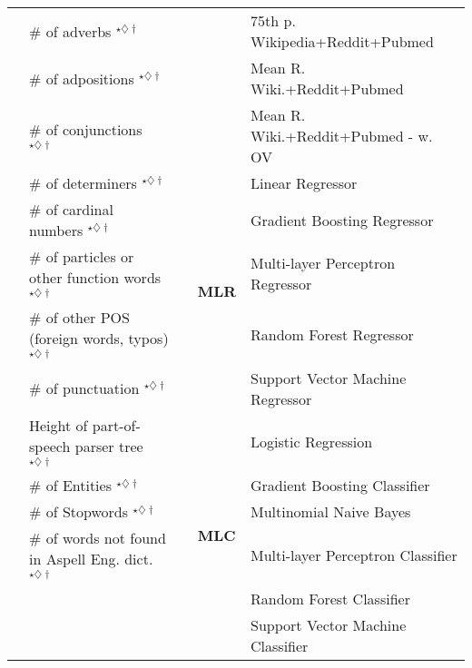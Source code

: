 \begin{table}[tb]
{\begin{tabular}{llcll}
 & \# of adverbs $^{\star\diamondsuit\dagger}$ &  &  & 75th p. Wikipedia+Reddit+Pubmed \tabularnewline
 & \# of adpositions $^{\star\diamondsuit\dagger}$ &  &  & Mean R. Wiki.+Reddit+Pubmed \tabularnewline 
 & \# of conjunctions $^{\star\diamondsuit\dagger}$ & &  & Mean R. Wiki.+Reddit+Pubmed - w. OV \tabularnewline
\cline{4-5} 
 & \# of determiners $^{\star\diamondsuit\dagger}$ & & \multirow{5}{*}{\textbf{MLR}} & Linear Regressor\tabularnewline  
 & \# of cardinal numbers $^{\star\diamondsuit\dagger}$ &  &  & Gradient Boosting Regressor\tabularnewline
 & \# of particles or other function words $^{\star\diamondsuit\dagger}$ &  &  & Multi-layer Perceptron Regressor\tabularnewline
 & \# of other POS (foreign words, typos) $^{\star\diamondsuit\dagger}$ &  &  & Random Forest Regressor\tabularnewline
 & \# of punctuation $^{\star\diamondsuit\dagger}$ &  &  & Support Vector Machine Regressor\tabularnewline
\cline{4-5} 
 & Height of part-of-speech parser tree $^{\star\diamondsuit\dagger}$ &  &  \multirow{6}{*}{\textbf{MLC}} & Logistic Regression\tabularnewline
 & \# of Entities $^{\star\diamondsuit\dagger}$ &  &  & Gradient Boosting Classifier\tabularnewline
 & \# of Stopwords $^{\star\diamondsuit\dagger}$ &  &  & Multinomial Naive Bayes\tabularnewline
 & \# of words not found in Aspell Eng. dict. $^{\star\diamondsuit\dagger}$ &  &  & Multi-layer Perceptron Classifier\tabularnewline
 &  &  &  & Random Forest Classifier\tabularnewline
 &  &  &  & Support Vector Machine Classifier\tabularnewline
\cline{1-2} \cline{4-5} 
\end{tabular}
}
\end{table}
